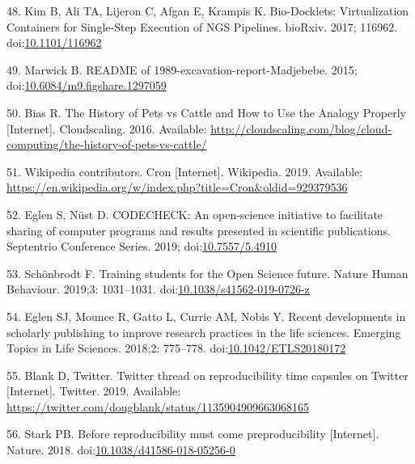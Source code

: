 \documentclass[10pt,letterpaper]{article}
\begin{document}
\leavevmode\hypertarget{ref-kim_bio-docklets_2017}{}%
48. Kim B, Ali TA, Lijeron C, Afgan E, Krampis K. Bio-Docklets:
Virtualization Containers for Single-Step Execution of NGS Pipelines.
bioRxiv. 2017; 116962.
doi:\href{https://doi.org/10.1101/116962}{10.1101/116962}

\leavevmode\hypertarget{ref-marwick_readme_2015}{}%
49. Marwick B. README of 1989-excavation-report-Madjebebe. 2015;
doi:\href{https://doi.org/10.6084/m9.figshare.1297059}{10.6084/m9.figshare.1297059}

\leavevmode\hypertarget{ref-bias_history_2016}{}%
50. Bias R. The History of Pets vs Cattle and How to Use the Analogy
Properly {[}Internet{]}. Cloudscaling. 2016. Available:
\url{http://cloudscaling.com/blog/cloud-computing/the-history-of-pets-vs-cattle/}

\leavevmode\hypertarget{ref-wikipedia_contributors_cron_2019}{}%
51. Wikipedia contributors. Cron {[}Internet{]}. Wikipedia. 2019.
Available:
\url{https://en.wikipedia.org/w/index.php?title=Cron\&oldid=929379536}

\leavevmode\hypertarget{ref-eglen_codecheck_2019}{}%
52. Eglen S, Nüst D. CODECHECK: An open-science initiative to facilitate
sharing of computer programs and results presented in scientific
publications. Septentrio Conference Series. 2019;
doi:\href{https://doi.org/10.7557/5.4910}{10.7557/5.4910}

\leavevmode\hypertarget{ref-schonbrodt_training_2019}{}%
53. Schönbrodt F. Training students for the Open Science future. Nature
Human Behaviour. 2019;3: 1031--1031.
doi:\href{https://doi.org/10.1038/s41562-019-0726-z}{10.1038/s41562-019-0726-z}

\leavevmode\hypertarget{ref-eglen_recent_2018}{}%
54. Eglen SJ, Mounce R, Gatto L, Currie AM, Nobis Y. Recent developments
in scholarly publishing to improve research practices in the life
sciences. Emerging Topics in Life Sciences. 2018;2: 775--778.
doi:\href{https://doi.org/10.1042/ETLS20180172}{10.1042/ETLS20180172}

\leavevmode\hypertarget{ref-blank_twitter_2019}{}%
55. Blank D, Twitter. Twitter thread on reproducibility time capsules on
Twitter {[}Internet{]}. Twitter. 2019. Available:
\url{https://twitter.com/dougblank/status/1135904909663068165}

\leavevmode\hypertarget{ref-stark_before_2018}{}%
56. Stark PB. Before reproducibility must come preproducibility
{[}Internet{]}. Nature. 2018.
doi:\href{https://doi.org/10.1038/d41586-018-05256-0}{10.1038/d41586-018-05256-0}

\nolinenumbers
\end{document}

